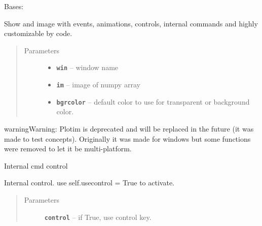 \documentclass[letterpaper,10pt,english]{sphinxmanual}
\begin{document}
\begin{fulllineitems}
\label{RRtoolbox.lib:RRtoolbox.lib.plotter.Plotim}
Bases: 

Show and image with events, animations, controls, internal
commands and highly customizable by code.
\begin{quote}\begin{description}
\item[{Parameters}] \leavevmode\begin{itemize}
\item {} 
\textbf{\texttt{win}} -- window name

\item {} 
\textbf{\texttt{im}} -- image of numpy array

\item {} 
\textbf{\texttt{bgrcolor}} -- default color to use for transparent or background color.

\end{itemize}

\end{description}\end{quote}

\begin{notice}{warning}{Warning:}
Plotim is deprecated and will be replaced in the future (it was made to
test concepts). Originally it was made for windows but some functions
were removed to let it be multi-platform.
\end{notice}

\begin{fulllineitems}
\label{RRtoolbox.lib:RRtoolbox.lib.plotter.Plotim.builtincmd}
Internal cmd control

\end{fulllineitems}


\begin{fulllineitems}
\label{RRtoolbox.lib:RRtoolbox.lib.plotter.Plotim.builtincontrol}
Internal control. use self.usecontrol = True to activate.
\begin{quote}\begin{description}
\item[{Parameters}] \leavevmode
\textbf{\texttt{control}} -- if True, use control key.


\end{description}
\end{quote}
\end{fulllineitems}
\end{fulllineitems}
\end{document}
